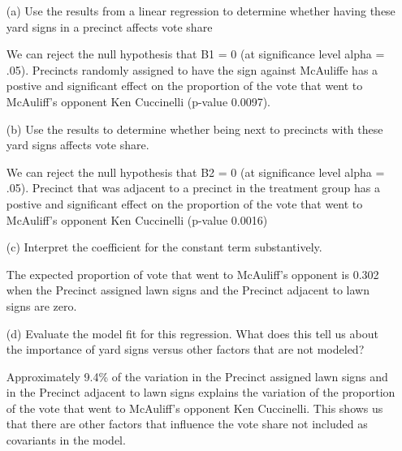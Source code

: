 \documentclass[12pt,letterpaper]{article}
\begin{document}
\vspace{.5cm}
\begin{enumerate}
	\item [(a)] Use the results from a linear regression to determine whether having these yard signs in a precinct affects vote share 
	
		 
	\vspace{.25cm}
	
We can reject the null hypothesis that B1 = 0 (at significance level alpha = .05).
Precincts randomly assigned to have the sign against McAuliffe has a postive and significant effect on the proportion of the vote that went to McAuliff's opponent Ken Cuccinelli (p-value 0.0097).
	
		\newpage		
	\item [(b)]  Use the results to determine whether being
	next to precincts with these yard signs affects vote
	share. \vspace{.25cm}
	
	 
\vspace{.25cm}

We can reject the null hypothesis that B2 = 0 (at significance level alpha = .05).
Precinct that was adjacent to a precinct in the treatment group has a postive and significant effect on the proportion of the vote that went to McAuliff's opponent Ken Cuccinelli (p-value 0.0016) 

	\item [(c)] Interpret the coefficient for the constant term substantively.
	\vspace{0.25cm}
	
The expected proportion of vote that went to McAuliff's opponent is 0.302 when the Precinct assigned lawn signs and the Precinct adjacent to lawn signs are zero.
	
	\item [(d)] Evaluate the model fit for this regression.  What does this	tell us about the importance of yard signs versus other factors that are not modeled?
	\vspace{0.25cm}
	
Approximately 9.4\% of the variation in the Precinct assigned lawn signs and in the Precinct adjacent to lawn signs explains the variation of the proportion of the vote that went to McAuliff's opponent Ken Cuccinelli. This shows us that there are other factors that influence the vote share not included as covariants in the model.
	
	
	
\end{enumerate}  
\end{document}
